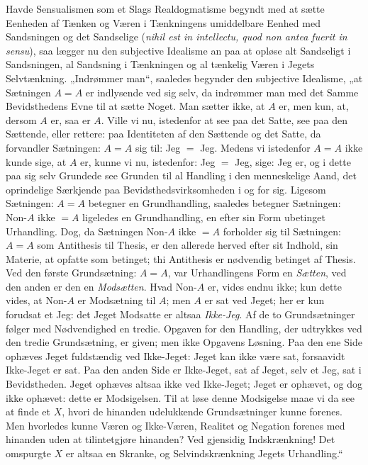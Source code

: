 \documentclass[11pt]{book}
\newcommand{\opage}[1]{\marginnote{\footnotesize\textit{[#1]}}}
\begin{document}
Havde Sensualismen som et Slags Realdogmatisme begyndt med at sætte
Eenheden af Tænken og Væren i Tænkningens umiddelbare Eenhed med
Sandsningen og det Sandselige (\textit{nihil est in intellectu, quod
non antea fuerit in sensu}), saa lægger nu den subjective Idealisme an
paa at opløse alt Sandseligt i Sandsningen, al Sandsning i Tænkningen
og al tænkelig Væren i Jegets Selvtænkning. „Indrømmer man“, saaledes
begynder den subjective Idealisme, „at Sætningen $A = A$ er
indlysende ved sig selv, da indrømmer man med det Samme Bevidsthedens
Evne til at sætte Noget. Man sætter ikke, at $A$ er, men kun, at,
dersom $A$ er, saa er $A$. Ville vi nu, istedenfor at see paa det
Satte, see paa den Sættende, eller rettere: paa Identiteten af den
Sættende og det Satte, da forvandler Sætningen: $A = A$ sig til: Jeg
$=$ Jeg. Medens vi istedenfor $A = A$ ikke
\opage{32} \setcounter{footnote}{0}%
kunde sige, at $A$ er, kunne vi nu, istedenfor: Jeg $=$ Jeg, sige: Jeg
er, og i dette paa sig selv Grundede see Grunden til al Handling i den
menneskelige Aand, det oprindelige Særkjende paa
Bevidsthedsvirksomheden i og for sig. Ligesom Sætningen: $A = A$
betegner en Grundhandling, saaledes betegner Sætningen:
$\text{Non-}A$ ikke $= A$ ligeledes en Grundhandling, en efter sin
Form ubetinget Urhandling. Dog, da Sætningen $\text{Non-}A$ ikke
$= A$ forholder sig til Sætningen: $A = A$ som Antithesis til Thesis,
er den allerede herved efter sit Indhold, sin Materie, at opfatte som
betinget; thi Antithesis er nødvendig betinget af Thesis. Ved den
første Grundsætning: $A = A$, var Urhandlingens Form en
\emph{Sætten}, ved den anden er den en \emph{Modsætten}. Hvad
$\text{Non-}A$ er, vides endnu ikke; kun dette vides, at
$\text{Non-}A$ er Modsætning til $A$; men $A$ er sat ved Jeget; her er
kun forudsat et Jeg: det Jeget Modsatte er altsaa \emph{Ikke-Jeg}. Af
de to Grundsætninger følger med Nødvendighed en tredie. Opgaven for
den Handling, der udtrykkes ved den tredie Grundsætning, er given; men
ikke Opgavens Løsning. Paa den ene Side ophæves Jeget fuldstændig ved
Ikke-Jeget: Jeget kan ikke være sat, forsaavidt Ikke-Jeget er sat. Paa
den anden Side er Ikke-Jeget, sat af Jeget, selv et Jeg, sat i
Bevidstheden. Jeget ophæves altsaa ikke ved Ikke-Jeget; Jeget er
ophævet, og dog ikke ophævet: dette er Modsigelsen. Til at løse denne
Modsigelse maae vi da see at finde et $X$, hvori de hinanden
udelukkende Grundsætninger kunne forenes. Men hvorledes kunne Væren og
Ikke-Væren, Realitet og Negation forenes med hinanden uden at
tilintetgjøre hinanden? Ved gjensidig Indskrænkning! Det omspurgte
$X$ er altsaa en Skranke, og Selvindskrænkning Jegets Urhandling.“
\end{document}
